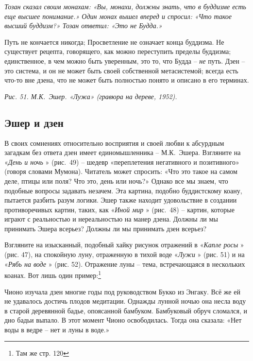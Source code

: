\documentclass[../main.tex]{subfiles}
\begin{document}
\emph{Тозан сказал своим монахам: «Вы, монахи, должны знать, что в буддизме есть еще высшее понимание.» Один монах вышел вперед и спросил: «Что такое высший буддизм?» Тозан ответил: «Это не Будда.»}

Путь не кончается никогда; Просветление не означает конца буддизма. Не существует рецепта, говорящего, как можно переступить пределы буддизма; единственное, в чем можно быть уверенным, это то, что Будда \--- \emph{не} путь. Дзен \--- это система, и он не может быть своей собственной метасистемой; всегда есть что-то вне дзена, что не может быть полностью понято и описано в его терминах.

\emph{Рис. 51. М.К.~Эшер. «Лужа» (гравюра на дереве, 1952).}


\subsection{Эшер и дзен}

В своих сомнениях относительно восприятия и своей любви к абсурдным загадкам без ответа дзен имеет единомышленника \--- М.К.~Эшера. Взгляните на «\emph{День и ночь} » (рис.~49) \--- шедевр «переплетения негативного и позитивного» (говоря словами Мумона). Читатель может спросить: «Что это такое на самом деле, птицы или поля? Что это, день или ночь?» Однако все мы знаем, что подобные вопросы задавать незачем. Эта картина, подобно буддистскому коану, пытается разбить разум логики. Эшер также находит удовольствие в создании противоречивых картин, таких, как «\emph{Иной мир} » (рис.~48) \--- картин, которые играют с реальностью и нереальностью на манер дзена. Должны ли мы принимать Эшера всерьез? Должны ли мы принимать дзен всерьез?

Взгляните на изысканный, подобный хайку рисунок отражений в «\emph{Капле росы} » (рис. 47), на спокойную луну, отраженную в тихой воде «\emph{Лужи} » (рис. 51) и на «\emph{Рябь на воде} » (рис. 52). Отражение луны \--- тема, встречающаяся в нескольких коанах. Вот лишь один пример:\footnote{Там же стр. 120}

\begin{koan}
    Чионо изучала дзен многие годы под руководством Букко из Энгаку. Всё же ей не удавалось достичь плодов медитации. Однажды лунной ночью она несла воду в старой деревянной бадье, опоясанной бамбуком. Бамбуковый обруч сломался, и дно бадьи выпало. В этот момент Чионо освободилась. Тогда она сказала: «Нет воды в ведре \--- нет и луны в воде.»
\end{koan}
\end{document}
